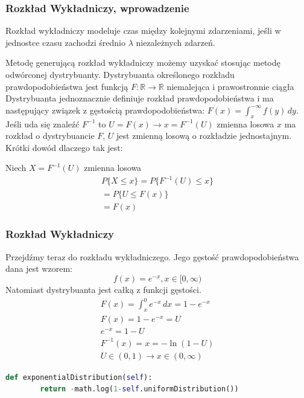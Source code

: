 \documentclass[9pt]{beamer}
\begin{document}
\begin{frame}
  \frametitle{Rozkład Wykładniczy, wprowadzenie}
  Rozkład wykładniczy modeluje czas między kolejnymi zdarzeniami, jeśli w jednostce czasu zachodzi średnio $\lambda$ niezależnych zdarzeń. 
  
  Metodę generującą rozkład wykładniczy możemy uzyskać stosując metodę odwórconej dystrybuanty. Dystrybuanta określonego rozkładu prawdopodobieństwa jest funkcją $F: \mathbb{R} \rightarrow \mathbb{R} $ niemalejąca i prawostronnie ciągła Dystrybuanta jednoznacznie definiuje rozkład prawdopodobieństwa i ma następujący związek z gęstością prawdopodobieństwa: $ F(x) =\int_{x}^{-\infty}  f(y) \,dy $. Jeśli uda się znaleźć $F^{-1}$ to $U=F(x) \rightarrow x=F^{-1}(U)$ zmienna losowa $x$ ma rozkład o dystrybuancie $F$, $U$ jest zmienną losową o rozkładzie jednostajnym. Krótki dowód dlaczego tak jest:

  Niech $X=F^{-1}(U)$ zmienna losowa
  \begin{gather*}
    P \{X\leq x\} = P\{F^{-1}(U)\leq x\} \\
    = P\{U\leq F(x)\} \\
    =F(x)
  \end{gather*}
\end{frame}
\begin{frame}[containsverbatim]
  \frametitle{Rozkład Wykładniczy}
  Przejdźmy teraz do rozkładu wykładniczego. Jego gęstość prawdopodobieństwa dana jest wzorem:
  \begin{equation*}
    f(x)=e^{-x},x\in [0,\infty)
  \end{equation*}
  Natomiast dystrybuanta jest całką z funkcji gęstości.
  \begin{gather*}
    F(x)=\int_{x}^{0}  e^{-x}\,dx =1-e^{-x} \\
    F(x)=1-e^{-x}=U \\
    e^{-x}=1-U \\
    F^{-1}(x)=x=-\ln(1-U) \\
    U \in (0,1) \rightarrow x\in (0, \infty)
  \end{gather*}
  \begin{lstlisting}[language=Python, caption=Metoda rozkładu Poissona]
    def exponentialDistribution(self):
        return -math.log(1-self.uniformDistribution())
    \end{lstlisting}
\end{frame}
\end{document}
